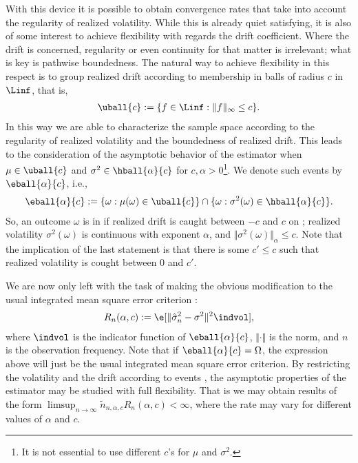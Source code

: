 With this device it is possible to obtain convergence rates that take into account the regularity of realized volatility. While this is already quiet satisfying,  it is also of some interest to achieve  flexibility with regards the drift coefficient. Where the drift is concerned, regularity or even continuity for that matter is irrelevant; what is key is pathwise boundedness. The natural way to achieve flexibility in this respect is to group realized drift according to membership in  balls of radius $c$ in $\Linf$, that is,   
\begin{align} 
  \uball{c} := \{f \in \Linf: \Vert f \Vert_\infty \le c \}.
\end{align}
In this way we are able to  characterize the sample space according to the regularity of realized volatility  and the boundedness of realized drift.  This leads to the consideration of the asymptotic behavior of the estimator when  $\mu \in \uball{c}$ and $\sigma^2 \in  \hball{\alpha}{c}$ for  $c, \alpha > 0$\footnote{It is not essential to use different $c$'s for $\mu$ and $\sigma^2$.}. We denote such events by $\eball{\alpha}{c}$, i.e., 
\begin{align}
  \eball{\alpha}{c}  := \{ \omega : \mu(\omega) \in \uball{c}\} \cap \{\omega: \sigma^2(\omega) \in \hball{\alpha}{c}\}.\notag
  \label{}
\end{align}
So, an outcome $\omega$  is in  if realized drift is caught between $-c$ and $c$ on \domain; realized volatility $\sigma^2(\omega)$  is \holder continuous with exponent $\alpha$,  and $\Vert \sigma^2(\omega) \Vert_\alpha \le c$. Note that the implication of the last statement is that there is some $c' \le c$ such that realized volatility is cought between $0$ and $c'$.     

We are now only left with the task of making the  obvious  modification to the usual  integrated mean square error criterion :
\begin{align}
  R_n(\alpha, c) := \e[\Vert \svn - \sigma^2\Vert^2\indvol],\notag
  \label{}
\end{align} 
where  $\indvol$ is the indicator function of $\eball{\alpha}{c}$, $\Vert \cdot \Vert$ is the \Ltwo norm, and $n$ is the observation frequency. Note that if $\eball{\alpha}{c} = \Omega$,  the expression above will just be the usual integrated mean square error criterion. By restricting the  volatility and the drift according to  events , the asymptotic properties of the estimator may be studied with full flexibility. That is we may  obtain results of the form  $\limsup_{n \to \infty}\tilde{n}_{n,\alpha,c} R_n(\alpha,c) < \infty$, where the rate may vary for different values of $\alpha$ and $c$. 

